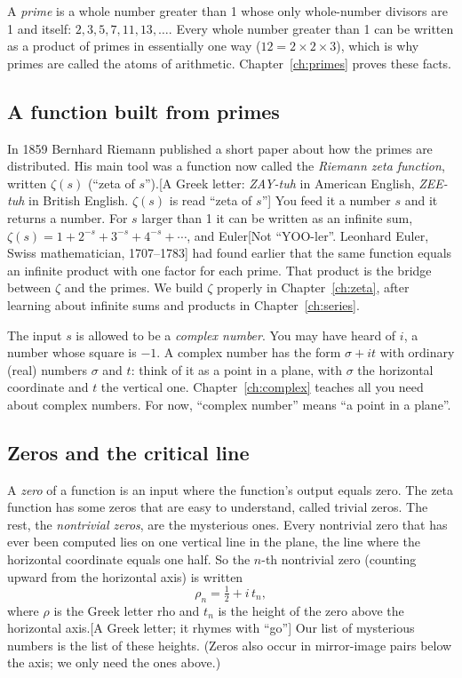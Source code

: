 A \emph{prime} is a whole number greater than 1 whose only whole-number divisors are 1 and itself: $2, 3, 5, 7, 11, 13, \ldots$. Every whole number greater than 1 can be written as a product of primes in essentially one way ($12 = 2\times2\times3$), which is why primes are called the atoms of arithmetic. Chapter~\ref{ch:primes} proves these facts.

\subsection{A function built from primes}

In 1859 Bernhard Riemann published a short paper \cite{riemann1859} about how the primes are distributed. His main tool was a function now called the \emph{Riemann zeta function}, written $\zeta(s)$ (``zeta of $s$'').[A Greek letter: \emph{ZAY-tuh} in American English, \emph{ZEE-tuh} in British English. $\zeta(s)$ is read ``zeta of $s$''] You feed it a number $s$ and it returns a number. For $s$ larger than 1 it can be written as an infinite sum, $\zeta(s) = 1 + 2^{-s} + 3^{-s} + 4^{-s} + \cdots$, and Euler[Not ``YOO-ler''. Leonhard Euler, Swiss mathematician, 1707--1783] had found earlier that the same function equals an infinite product with one factor for each prime. That product is the bridge between $\zeta$ and the primes. We build $\zeta$ properly in Chapter~\ref{ch:zeta}, after learning about infinite sums and products in Chapter~\ref{ch:series}.

The input $s$ is allowed to be a \emph{complex number}. You may have heard of $i$, a number whose square is $-1$. A complex number has the form $\sigma + i t$ with ordinary (real) numbers $\sigma$ and $t$: think of it as a point in a plane, with $\sigma$ the horizontal coordinate and $t$ the vertical one. Chapter~\ref{ch:complex} teaches all you need about complex numbers. For now, ``complex number'' means ``a point in a plane''.

\subsection{Zeros and the critical line}

A \emph{zero} of a function is an input where the function's output equals zero. The zeta function has some zeros that are easy to understand, called trivial zeros. The rest, the \emph{nontrivial zeros}, are the mysterious ones. Every nontrivial zero that has ever been computed lies on one vertical line in the plane, the line where the horizontal coordinate equals one half. So the $n$-th nontrivial zero (counting upward from the horizontal axis) is written
\begin{equation}
\rho_n = \tfrac12 + i\,t_n ,
\label{eq:intro-rho}
\end{equation}
where $\rho$ is the Greek letter rho and $t_n$ is the height of the zero above the horizontal axis.[A Greek letter; it rhymes with ``go''] Our list of mysterious numbers is the list of these heights. (Zeros also occur in mirror-image pairs below the axis; we only need the ones above.)


